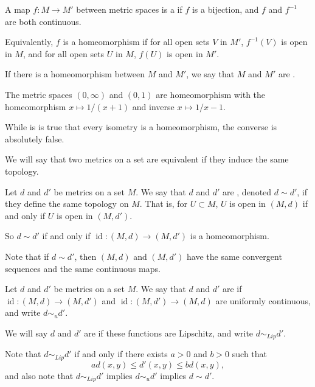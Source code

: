 \documentclass[a4paper]{scrartcl}
\begin{document}
\begin{definition}[Homeomorphism]
    A map $f: M \rightarrow M'$ between metric spaces is a  if $f$ is a bijection, and $f$ and $f^{-1}$ are both continuous.

    Equivalently, $f$ is a homeomorphism if for all open sets $V$ in $M'$, $f^{-1}(V)$ is open in $M$, and for all open sets $U$ in $M$, $f(U)$ is open in $M'$.

    If there is a homeomorphism between $M$ and $M'$, we say that $M$ and $M'$ are .
\end{definition}

\begin{example}
    The metric spaces $(0, \infty)$ and $(0, 1)$ are homeomorphism with the homeomorphism $x \mapsto 1/(x + 1)$ and inverse $x \mapsto 1/x - 1$.
\end{example}

While is is true that every isometry is a homeomorphism, the converse is absolutely false.

We will say that two metrics on a set are equivalent if they induce the same topology.

\begin{definition}
    Let $d$ and $d'$ be metrics on a set $M$. We say that $d$ and $d'$ are , denoted $d \sim d'$, if they define the same topology on $M$. That is, for $U \subset M$, $U$ is open in $(M, d)$ if and only if $U$ is open in $(M, d')$.
\end{definition}

So $d \sim d'$ if and only if $\operatorname{id}: (M, d) \rightarrow (M, d')$ is a homeomorphism. 

Note that if $d \sim d'$, then $(M, d)$ and $(M, d')$ have the same convergent sequences and the same continuous maps.

\begin{definition}
    Let $d$ and $d'$ be metrics on a set $M$. We say that $d$ and $d'$ are  if $\operatorname{id}: (M, d) \rightarrow (M, d')$ and $\operatorname{id}: (M, d') \rightarrow (M, d)$ are uniformly continuous, and write $d \sim_u d'$.

    We will say $d$ and $d'$ are  if these functions are Lipschitz, and write $d \sim_{Lip} d'$.
\end{definition}

Note that $d \sim_{Lip} d'$ if and only if there exists $a > 0$ and $b > 0$ such that
$$
a d(x, y) \leq d'(x, y) \leq b d(x, y),
$$
and also note that $d \sim_{Lip} d'$ implies $d \sim_u d'$ implies $d \sim d'$.
\end{document}
